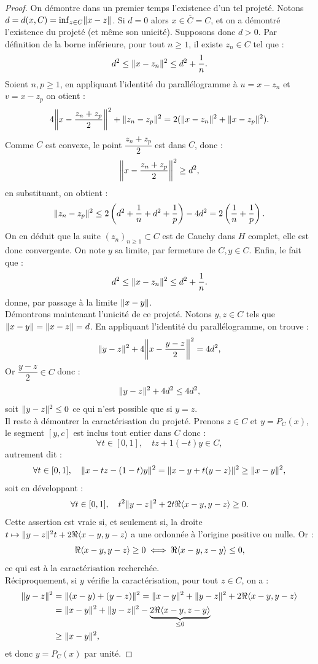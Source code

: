 \begin{proof}
On démontre dans un premier temps l'existence d'un tel projeté.
Notons $d=d(x,C)=\inf_{z \in C} \norm{x-z}$.
Si $d=0$ alors $x\in \overline{C} = C$, et on a démontré l'existence du projeté (et même son unicité).
Supposons donc $d >0$. 
Par définition de la borne inférieure, pour tout $n \geq 1$, il existe $z_n \in C$ tel que :
\[ d^2 \leq \norm{x-z_n}^2 \leq d^2 + \dfrac1{n} . \]
Soient $n,p \geq 1$, en appliquant l'identité du parallélogramme à $u=x-z_n$ et $v=x-z_p$ on otient :
\[ 4 \norm*{x- \dfrac{z_n+z_p}2}^2 + \norm{z_n-z_p}^2 = 2 ( \norm{x-z_n}^2 + \norm{x-z_p}^2 ) . \]
Comme $C$ est convexe, le point $\dfrac{z_n+z_p}2$ est dans $C$, donc :
\[ \norm*{x- \dfrac{z_n+z_p}2}^2 \geq d^2 , \]
en substituant, on obtient :
\[ \norm{z_n-z_p}^2 \leq 2 \left ( d^2 + \dfrac1{n} + d^2 + \dfrac1{p} \right ) - 4d^2 = 2 \left ( \dfrac1{n} + \dfrac1{p} \right ) . \]
On en déduit que la suite $(z_n)_{n \geq 1} \subset C$ est de Cauchy dans $H$ complet, elle est donc convergente. 
On note $y$ sa limite, par fermeture de $C, y \in C$.
Enfin, le fait que :
\[ d^2 \leq \norm{x-z_n}^2 \leq d^2 + \dfrac1{n} . \]
donne, par passage à la limite $\norm{x-y}$. \\

Démontrons maintenant l'unicité de ce projeté. Notons $y, z \in C$ tels que $\norm{x-y}=\norm{x-z}=d$.
En appliquant l'identité du parallélogramme, on trouve :
\[ \norm{y-z}^2 + 4 \norm*{x - \dfrac{y-z}2}^2 = 4d^2 , \]
Or $\dfrac{y-z}2 \in C$ donc :
\[ \norm{y-z}^2 + 4d^2 \leq 4d^2 ,\]
soit $\norm{y-z}^2 \leq 0$ ce qui n'est possible que si $y=z$. \\

Il reste à démontrer la caractérisation du projeté.
Prenons $z \in C$ et $y=P_C(x)$, le segment $[y,c]$ est inclus tout entier dans $C$ donc :
\[ \forall t \in [0,1], \quad tz + 1(-t)y \in C , \]
autrement dit :
\[ \forall t \in [0,1], \quad \norm{x - tz - (1-t)y}^2 = \norm{x-y +t(y-z)}^2 \geq \norm{x-y}^2 , \]
soit en développant :
\[ \forall t \in [0,1], \quad t^2 \norm{y-z}^2 +2t \Re{\angl{x-y,y-z}} \geq 0 . \]
Cette assertion est vraie si, et seulement si, la droite $t \mapsto \norm{y-z}^2 t + 2 \Re{\angl{x-y,y-z}}$ a une ordonnée à l'origine
positive ou nulle. Or :
\[ \Re{\angl{x-y,y-z}} \geq 0 \iff \Re{\angl{x-y,z-y}} \leq 0 , \]
ce qui est à la caractérisation recherchée. \\
Réciproquement, si $y$ vérifie la caractérisation, pour tout $z \in C$, on a :
\begin{align*}
\norm{y-z}^2 & = \norm{(x-y)+(y-z)}^2 = \norm{x-y}^2 + \norm{y-z}^2 + 2 \Re{\angl{x-y,y-z}} \\
& = \norm{x-y}^2 + \norm{y-z}^2 - \underbrace{2 \Re{\angl{x-y,z-y}}}_{\leq 0} \\
& \geq \norm{x-y}^2 ,
\end{align*}
et donc $y=P_C(x)$ par unité.
\end{proof}

